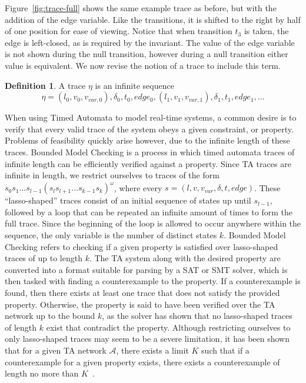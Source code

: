 \documentclass[a4paper,11pt]{report}
\theoremstyle{definition}
\newtheorem{defn}{Definition}[section]
\begin{document}
Figure~\ref{fig:trace-full} shows the same example trace as before, but with the
addition of the edge variable. Like the transitions, it is shifted to the right
by half of one position for ease of viewing. Notice that when transition $t_{3}$
is taken, the edge is left-closed, as is required by the invariant. The value of
the edge variable is not shown during the null transition, however during a null
transition either value is equivalent. We now revise the notion of a trace to
include this term.
\begin{defn} A trace $\eta$ is an infinite sequence
  \[\eta = (l_{0},v_{0},v_{var,0}),\delta_{0},t_{0},edge_{0},(l_{1},v_{1},v_{var,1}),\delta_{1},t_{1},edge_{1}, \ldots\]
\end{defn}

When using Timed Automata to model real-time systems, a common desire is to
verify that every valid trace of the system obeys a given constraint, or
property. Problems of feasibility quickly arise however, due to the infinite
length of these traces. Bounded Model Checking is a process in which timed
automata traces of infinite length can be efficiently verified against a
property. Since TA traces are infinite in length, we restrict ourselves to
traces of the form
\(s_0 s_1\ldots s_{l-1}{(s_l s_{l+1}\ldots s_{k-1}s_k)}^\omega\), where every
$s = (l,v,v_{var},\delta,t,edge)$. These ``lasso-shaped'' traces consist of an
initial sequence of states up until \(s_{l-1}\), followed by a loop that can be
repeated an infinite amount of times to form the full trace. Since the beginning
of the loop is allowed to occur anywhere within the sequence, the only variable
is the number of distinct states \(k\). Bounded Model Checking refers to
checking if a given property is satisfied over lasso-shaped traces of up to
length \(k\). The TA system along with the desired property are converted into a
format suitable for parsing by a SAT or SMT solver, which is then tasked with
finding a counterexample to the property. If a counterexample is found, then
there exists at least one trace that does not satisfy the provided property.
Otherwise, the property is said to have been verified over the TA network up to
the bound \(k\), as the solver has shown that no lasso-shaped traces of length
\(k\) exist that contradict the property. Although restricting ourselves to only
lasso-shaped traces may seem to be a severe limitation, it has been shown that
for a given TA network $\mathcal{A}$, there exists a limit $K$ such that if a
counterexample for a given property exists, there exists a counterexample of
length no more than $K$~\cite{biere99}.
\end{document}
